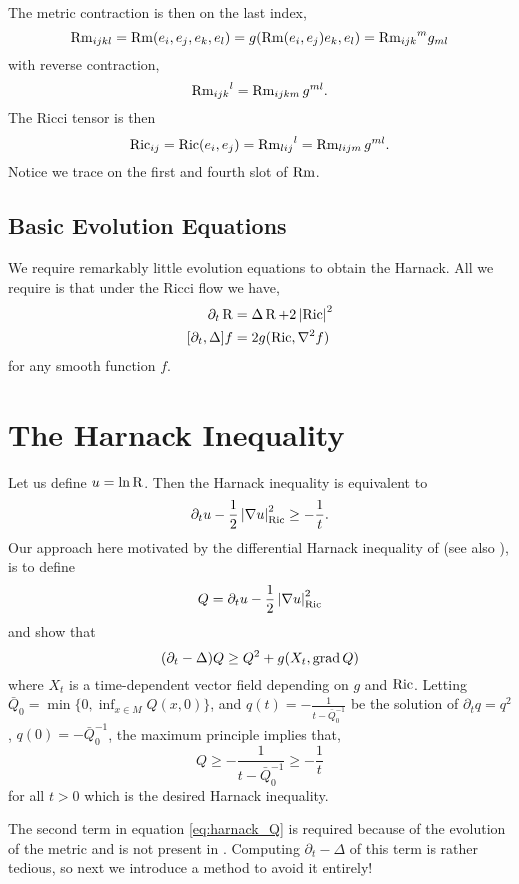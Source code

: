 \documentclass{amsart}
\begin{document}
The metric contraction is then on the last index,
\[
\operatorname{Rm}_{ijkl} = \operatorname{Rm}(e_i, e_j, e_k, e_l) = g(\operatorname{Rm}(e_i, e_j) e_k, e_l) = {\operatorname{Rm}_{ijk}}^mg_{ml}
\]
with reverse contraction,
\[
{\operatorname{Rm}_{ijk}}^l = \operatorname{Rm}_{ijkm} g^{ml}.
\]
The Ricci tensor is then
\[
\operatorname{Ric}_{ij} = \operatorname{Ric}(e_i, e_j) = {\operatorname{Rm}_{lij}}^l = \operatorname{Rm}_{lijm} g^{ml}.
\]
Notice we trace on the first and fourth slot of \(\operatorname{Rm}\).

\subsection{Basic Evolution Equations}
\label{subsec:evolution}

We require remarkably little evolution equations to obtain the Harnack. All we require is that under the Ricci flow we have,
\begin{align}
\partial_t \R &= \laplace \R + 2 \abs{\ric}^2 \label{eq:R_ev} \\
[\partial_t, \laplace] f &= 2 g(\ric, \nabla^2 f) \label{eq:R_commutator}
\end{align}
for any smooth function \(f\).

\section{The Harnack Inequality}
\label{sec:harnack}

Let us define \(u = \ln \operatorname{R}\). Then the Harnack inequality is equivalent to
\begin{equation}
\label{eq:harnack_equiv}
\partial_t u - \frac{1}{2} \left|{\nabla u}\right|_{\operatorname{Ric}}^2 \geq - \frac{1}{t}.
\end{equation}
Our approach here motivated by the differential Harnack inequality of \cite{LiYau:/1986} (see also \cite{Hamilton:/1986,HamiltonCao:/2009}), is to define
\begin{equation}
\label{eq:harnack_Q}
Q = \partial_t u - \frac{1}{2} \left|{\nabla u}\right|_{\operatorname{Ric}}^2
\end{equation}
and show that
\[
(\partial_t - \Delta) Q \geq Q^2 + g(X_t, \operatorname{grad} Q)
\]
where \(X_t\) is a time-dependent vector field depending on \(g\) and \(\operatorname{Ric}\). Letting \(\bar{Q}_0 = \min\{0, \inf_{x\in M} Q(x, 0)\}\), and \(q(t) = -\tfrac{1}{t - \bar{Q}_0^{-1}}\) be the solution of \(\partial_t q = q^2\), \(q(0) = -\bar{Q}_0^{-1}\), the maximum principle implies that,
\[
Q \geq -\frac{1}{t - \bar{Q}_0^{-1}} \geq -\frac{1}{t}
\]
for all \(t > 0\) which is the desired Harnack inequality.

The second term in equation \eqref{eq:harnack_Q} is required because of the evolution of the metric and is not present in \cite{LiYau:/1986}. Computing \(\partial_t - \Delta\) of this term is rather tedious, so next we introduce a method to avoid it entirely!
\end{document}

